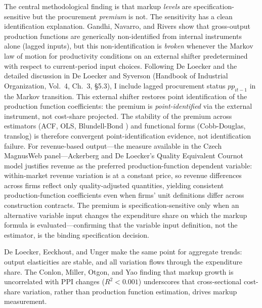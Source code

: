 \documentclass[11pt]{article}
\begin{document}
The central methodological finding is that markup \emph{levels} are specification-sensitive but the procurement \emph{premium} is not. The sensitivity has a clean identification explanation. Gandhi, Navarro, and Rivers \cite{GNR2020} show that gross-output production functions are generically non-identified from internal instruments alone (lagged inputs), but this non-identification is \emph{broken} whenever the Markov law of motion for productivity conditions on an external shifter predetermined with respect to current-period input choices. Following De Loecker \cite{DeLoecker2013} and the detailed discussion in De Loecker and Syverson \cite{DLS2021} (Handbook of Industrial Organization, Vol.~4, Ch.~3, \S5.3), I include lagged procurement status $pp_{it-1}$ in the Markov transition. This external shifter restores point identification of the production function coefficients: the premium is \emph{point-identified} via the external instrument, not cost-share projected. The stability of the premium across estimators (ACF, OLS, Blundell-Bond \cite{BlundellBond1998}) and functional forms (Cobb-Douglas, translog) is therefore convergent point-identification evidence, not identification failure. For revenue-based output---the measure available in the Czech MagnusWeb panel---Ackerberg and De Loecker's \cite{ADLQEC2026} Quality Equivalent Cournot model justifies revenue as the preferred production-function dependent variable: within-market revenue variation is at a constant price, so revenue differences across firms reflect only quality-adjusted quantities, yielding consistent production-function coefficients even when firms' unit definitions differ across construction contracts. The premium is specification-sensitive only when an alternative variable input changes the expenditure share on which the markup formula is evaluated---confirming that the variable input definition, not the estimator, is the binding specification decision.

De Loecker, Eeckhout, and Unger \cite{DLEU2025reply} make the same point for aggregate trends: output elasticities are stable, and all variation flows through the expenditure share. The Conlon, Miller, Otgon, and Yao \cite{CMOY2023} finding that markup growth is uncorrelated with PPI changes ($R^2 < 0.001$) underscores that cross-sectional cost-share variation, rather than production function estimation, drives markup measurement.
\end{document}

